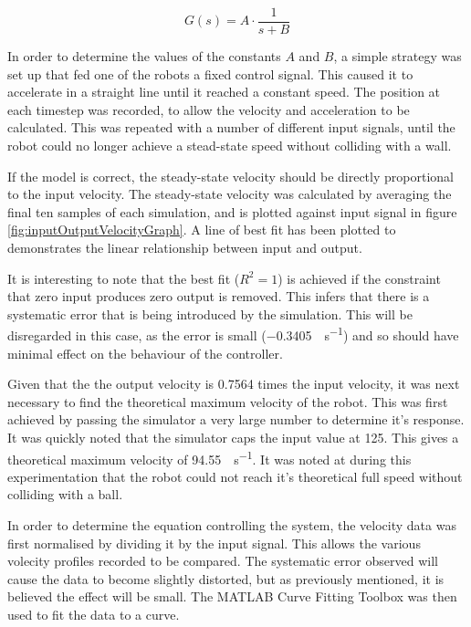 \documentclass[10pt]{article} \usepackage[a4paper]{geometry}
\begin{document}
\begin{equation}
 \label{eq:basicMotorModel}
 G\left(s\right) = A \cdot \frac{1}{s+B}
\end{equation}

In order to determine the values of the constants $A$ and $B$, a simple strategy
was set up that fed one of the robots a fixed control signal.  This caused it to
accelerate in a straight line until it reached a constant speed.  The position
at each timestep was recorded, to allow the velocity and acceleration to be
calculated.  This was repeated with a number of different input signals, until
the robot could no longer achieve a stead-state speed without colliding with a
wall.

If the model is correct, the steady-state velocity should be directly
proportional to the input velocity.  The steady-state velocity was calculated by
averaging the final ten samples of each simulation, and is plotted against input
signal in figure \ref{fig:inputOutputVelocityGraph}.  A line of best fit has
been plotted to demonstrates the linear relationship between input and output.

It is interesting to note that the best fit ($R^2 = 1$) is achieved if the
constraint that zero input produces zero output is removed.  This infers that
there is a systematic error that is being introduced by the simulation.  This
will be disregarded in this case, as the error is small
(\SI{-0.3405}{\inch\per\second}) and so should have minimal effect on the
behaviour of the controller.

Given that the the output velocity is 0.7564 times the input velocity, it was
next necessary to find the theoretical maximum velocity of the robot.  This was
first achieved by passing the simulator a very large number to determine it's
response.  It was quickly noted that the simulator caps the input value at 125.
This gives a theoretical maximum velocity of \SI{94.55}{\inch\per\second}.   It
was noted at during this experimentation that the robot could not reach it's
theoretical full speed without colliding with a ball.

In order to determine the equation controlling the system, the velocity data was
first normalised by dividing it by the input signal.  This allows the various
volecity profiles recorded to be compared.  The systematic error observed will
cause the data to become slightly distorted, but as previously mentioned, it is
believed the effect will be small.  The MATLAB Curve Fitting Toolbox was then
used to fit the data to a curve.
\end{document}
